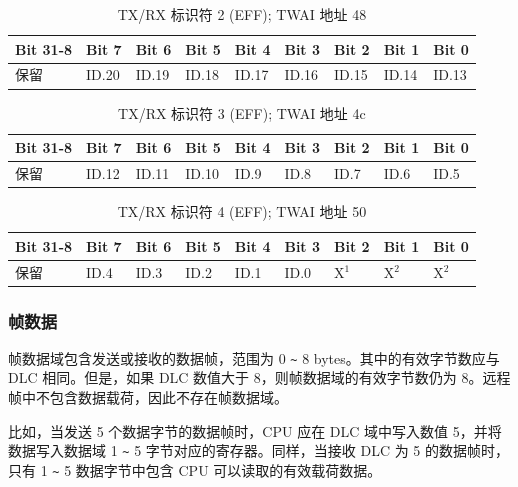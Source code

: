 \documentclass[main\_\_CN.tex]{subfiles}
\begin{document}
\begin{longtable}[c]{|p{1.4cm}|p{1.4cm}|p{1.4cm}|p{1.4cm}|p{1.4cm}|p{1.4cm}|p{1.4cm}|p{1.4cm}|p{1.4cm}|}
    \caption{TX/RX 标识符 2 (EFF); TWAI 地址 \hexprefix{}48}
    \label{table:tx_id2_eff}\\
    \hline
       \rowcolor{lightgray}
    Bit 31-8 & Bit 7 & Bit 6 & Bit 5 & Bit 4 & Bit 3 & Bit 2 & Bit 1 & Bit 0\\
    \hline
    保留 & ID.20 & ID.19 & ID.18 & ID.17 & ID.16 & ID.15 & ID.14 & ID.13\\
    \hline
\end{longtable}

\begin{longtable}[c]{|p{1.4cm}|p{1.4cm}|p{1.4cm}|p{1.4cm}|p{1.4cm}|p{1.4cm}|p{1.4cm}|p{1.4cm}|p{1.4cm}|}
    \caption{TX/RX 标识符 3 (EFF); TWAI 地址 \hexprefix{}4c}
    \label{table:tx_id3_eff}\\
    \hline
       \rowcolor{lightgray}
    Bit 31-8 & Bit 7 & Bit 6 & Bit 5 & Bit 4 & Bit 3 & Bit 2 & Bit 1 & Bit 0\\
    \hline
    保留 & ID.12 & ID.11 & ID.10 & ID.9 & ID.8 & ID.7 & ID.6 & ID.5\\
    \hline
\end{longtable}

\begin{longtable}[c]{|p{1.4cm}|p{1.4cm}|p{1.4cm}|p{1.4cm}|p{1.4cm}|p{1.4cm}|p{1.4cm}|p{1.4cm}|p{1.4cm}|}
    \caption{TX/RX 标识符 4 (EFF); TWAI 地址 \hexprefix{}50}
    \label{table:tx_id4_eff}\\
    \hline
       \rowcolor{lightgray}
    Bit 31-8 & Bit 7 & Bit 6 & Bit 5 & Bit 4 & Bit 3 & Bit 2 & Bit 1 & Bit 0\\
    \hline
    保留 & ID.4 & ID.3 & ID.2 & ID.1 & ID.0 & X$^1$ & X$^2$ & X$^2$\\
    \hline
\end{longtable}

\subsubsection{帧数据}
帧数据域包含发送或接收的数据帧，范围为 0 \verb+~+ 8 bytes。其中的有效字节数应与 DLC 相同。但是，如果 DLC 数值大于 8，则帧数据域的有效字节数仍为 8。远程帧中不包含数据载荷，因此不存在帧数据域。

比如，当发送 5 个数据字节的数据帧时，CPU 应在 DLC 域中写入数值 5，并将数据写入数据域 1 \verb+~+ 5 字节对应的寄存器。同样，当接收 DLC 为 5 的数据帧时，只有 1 \verb+~+ 5 数据字节中包含 CPU 可以读取的有效载荷数据。
\end{document}
